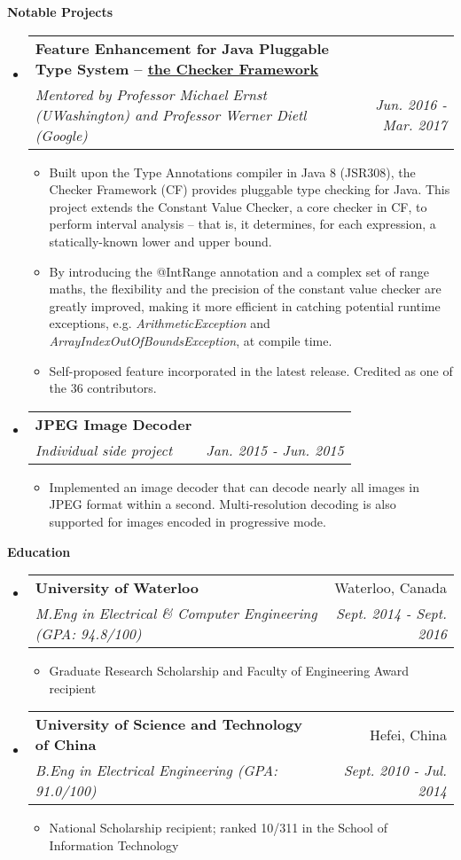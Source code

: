 \documentclass[letterpaper,10pt]{article}
\makeatletter
\newcommand{\resitem}[1]{\item #1 \vspace{-2pt}}
\newcommand{\resheading}[1]{{\large \colorbox{mygrey}{\begin{minipage}{\textwidth}{\textbf{#1 \vphantom{p\^{E}}}}\end{minipage}}}}
\newcommand{\ressubheading}[4]{
\begin{tabular*}{7.0in}{l@{\extracolsep{\fill}}r}
		\textbf{#1} & #2 \\
		\textit{#3} & \textit{#4} \\
\end{tabular*}\vspace{-6pt}}
\makeatother
\begin{document}
\resheading{Notable Projects}
\begin{itemize}
\itemsep0em
\item
	\ressubheading{Feature Enhancement for Java Pluggable Type System -- \href{https://github.com/typetools/checker-framework}{the Checker Framework}}{}{Mentored by Professor Michael Ernst (UWashington) and Professor Werner Dietl (Google)}{Jun. 2016 - Mar. 2017}
	\begin{itemize}
        \resitem{Built upon the Type Annotations compiler in Java 8 (JSR308), the Checker Framework (CF) provides pluggable type checking for Java. This project extends the Constant Value Checker, a core checker in CF, to perform interval analysis -- that is, it determines, for each expression, a statically-known lower and upper bound.}
        \resitem{By introducing the @IntRange annotation and a complex set of range maths, the flexibility and the precision of the constant value checker are greatly improved, making it more efficient in catching potential runtime exceptions, e.g. \textit{ArithmeticException} and \textit{ArrayIndexOutOfBoundsException}, at compile time.}
        \resitem{Self-proposed feature incorporated in the latest release. Credited as one of the 36 contributors.}
	\end{itemize}
\item
	\ressubheading{JPEG Image Decoder}{}{Individual side project}{Jan. 2015 - Jun. 2015}
	\begin{itemize}
		\resitem{Implemented an image decoder that can decode nearly all images in JPEG format within a second. Multi-resolution decoding is also supported for images encoded in progressive mode.}
	\end{itemize}
	
\end{itemize}

\resheading{Education}
\begin{itemize}
\itemsep0em
\item
	\ressubheading{University of Waterloo}{Waterloo, Canada}{M.Eng in Electrical \& Computer Engineering (GPA: 94.8/100)}{Sept. 2014 - Sept. 2016}
	\begin{itemize}
        \resitem{Graduate Research Scholarship and Faculty of Engineering Award recipient}
	\end{itemize}
\item
	\ressubheading{University of Science and Technology of China}{Hefei, China}{B.Eng in Electrical Engineering (GPA: 91.0/100)}{Sept. 2010 - Jul. 2014}
	\begin{itemize}
        \resitem{ National Scholarship recipient; ranked 10/311 in the School of Information Technology}
	\end{itemize}

\end{itemize}
\end{document}
